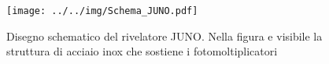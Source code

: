 \begin{figure}[h]\centering\texttt{[image: ../../img/Schema\_JUNO.pdf]}\caption{Disegno schematico del rivelatore JUNO. Nella figura e visibile la struttura di acciaio inox che sostiene i fotomoltiplicatori}\label{fig:Schema_JUNO}\end{figure}
